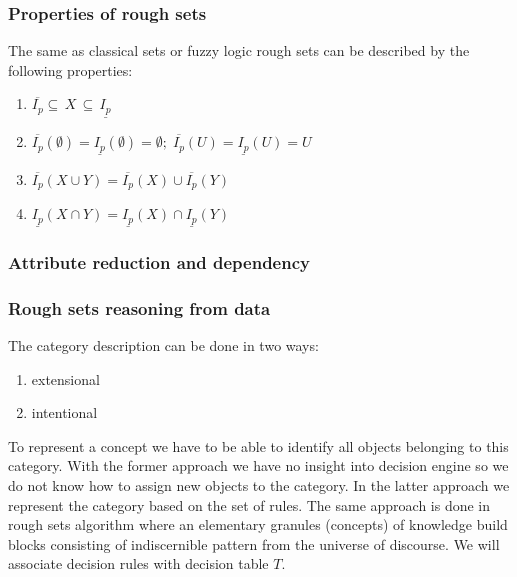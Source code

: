 \subsubsection{Properties of rough sets}
The same as classical sets or fuzzy logic rough sets can be described by the
following properties:
\begin{enumerate}
    \item $\overline{I_p} \subseteq \, X \, \subseteq \, \underline{I_p}$
    \item $\overline{I_p}(\emptyset) = \underline{I_p}(\emptyset) = \emptyset;
        \;
        \overline{I_p}(U) = \underline{I_p}(U) = U $
    \item $\overline{I_p}(X \cup Y) = \overline{I_p}(X) \cup \overline{I_p}(Y)$
    \item $\underline{I_p}(X \cap Y) = \underline{I_p}(X) \cap \underline{I_p}(Y)$
\end{enumerate}

\subsubsection{Attribute reduction and dependency}
\label{cha:Rough_set_attribute_reduction}



\subsubsection{Rough sets reasoning from data}
The category description can be done in two ways:
\begin{enumerate}
    \item extensional
    \item intentional
\end{enumerate}
To represent a concept we have to be able to identify 
all objects belonging to this category. 
With the former approach we have no insight 
into decision engine so we do not know how 
to assign new objects to the category. In 
the latter approach we represent the category 
based on the set of rules. The same approach 
is done in rough sets algorithm where an elementary 
granules (concepts) of knowledge build blocks consisting 
of indiscernible pattern from the universe of discourse. 
We will associate decision rules with decision table $T$.

